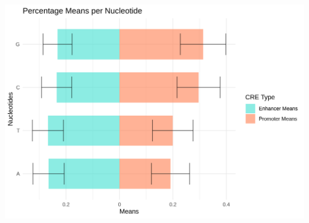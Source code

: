 \documentclass[
  letterpaper,
  DIV=11,
  numbers=noendperiod]{scrartcl}
\begin{document}
\begin{center}
\includegraphics[width=\textwidth,height=1\textheight]{gb-test-pdf_files/figure-pdf/unnamed-chunk-21-1.png}
\end{center}
\end{document}
